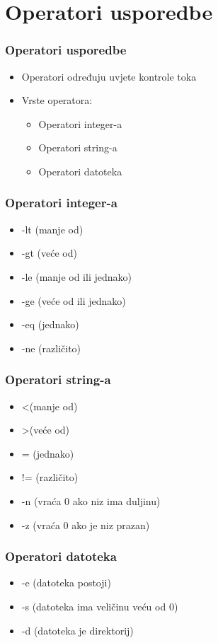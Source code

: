 \documentclass{beamer}
\begin{document}
\section{Operatori usporedbe}
\begin{frame}
\frametitle{Operatori usporedbe}
\begin{itemize}
	\item Operatori određuju uvjete kontrole toka
	\item Vrste operatora:
	\begin{itemize}
		\item Operatori integer-a
		\item Operatori string-a
		\item Operatori datoteka		
	\end{itemize}
\end{itemize}
\end{frame}

\begin{frame}
\frametitle{Operatori integer-a}
\begin{itemize}
	\item -lt (manje od)
	\item -gt (veće od)
	\item -le (manje od ili jednako)
	\item -ge (veće od ili jednako)
	\item -eq (jednako)
	\item -ne (različito)
\end{itemize}
\end{frame}

\begin{frame}
\frametitle{Operatori string-a}
\begin{itemize}
	\item \textless (manje od)
	\item \textgreater (veće od)
	\item = (jednako)
	\item != (različito)
	\item -n (vraća 0 ako niz ima duljinu)
	\item -z (vraća 0 ako je niz prazan)
\end{itemize}
\end{frame}

\begin{frame}
\frametitle{Operatori datoteka}
\begin{itemize}
	\item -e (datoteka postoji)
	\item -s (datoteka ima veličinu veću od 0)
	\item -d (datoteka je direktorij)
\end{itemize}
\end{frame}
\end{document}
